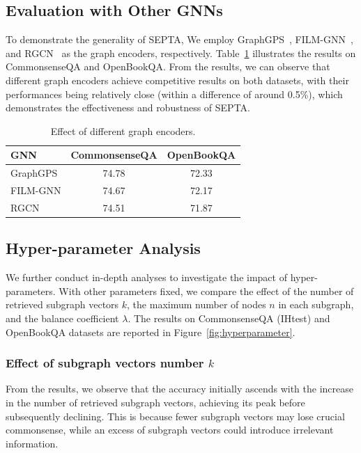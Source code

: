 \documentclass[runningheads]{llncs}
\begin{document}
\subsection{Evaluation with Other GNNs}
To demonstrate the generality of SEPTA, We employ GraphGPS~\cite{ref:gps}, FILM-GNN~\cite{ref:film}, and RGCN~\cite{ref:rgcn} as the graph encoders, respectively. Table~\ref{tab:gnn} illustrates the results on CommonsenseQA and OpenBookQA. From the results, we can observe that different graph encoders achieve competitive results on both datasets, with their performances being relatively close (within a difference of around 0.5\%), which demonstrates the effectiveness and robustness of SEPTA.
\begin{table}[t!]
\centering
\caption{Effect of different graph encoders.}
\resizebox{0.55\linewidth}{!} {
\begin{tabular}{lcc}
    \toprule  
    \textbf{GNN}& \textbf{CommonsenseQA} & \textbf{OpenBookQA}\\
    \midrule
    GraphGPS & 74.78 & 72.33 \\
    FILM-GNN & 74.67 & 72.17 \\
    RGCN & 74.51 & 71.87 \\
    \bottomrule 
\end{tabular}
}
\label{tab:gnn}
\end{table}

\subsection{Hyper-parameter Analysis}
We further conduct in-depth analyses to investigate the impact of hyper-parameters. With other parameters fixed, we compare the effect
of the number of retrieved subgraph vectors $k$, the maximum number of nodes $n$ in each subgraph, and the balance coefficient $\lambda$. The results on CommonsenseQA (IHtest) and OpenBookQA datasets are reported in Figure~\ref{fig:hyperparameter}.

\subsubsection{Effect of subgraph vectors number $k$} From the results, we observe that the accuracy
initially ascends with the increase in the number of retrieved subgraph vectors, achieving its peak
before subsequently declining. This is because fewer subgraph vectors may lose crucial commonsense, while an excess of subgraph vectors could introduce irrelevant information.
\end{document}
